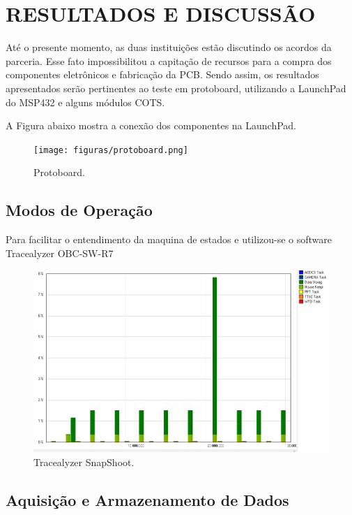 \chapter[RESULTADOS E DISCUSSÃO]{RESULTADOS E DISCUSSÃO}

Até o presente momento, as duas instituições estão discutindo os acordos da parceria. Esse fato impossibilitou a capitação de recursos para a compra dos componentes eletrônicos e fabricação da PCB. Sendo assim, os resultados apresentados serão pertinentes ao teste em protoboard, utilizando a LaunchPad do MSP432 e alguns módulos COTS.

A Figura abaixo mostra a conexão dos componentes na LaunchPad.

\begin{figure}[h]
	\centering
	\caption{Protoboard.}
	\texttt{[image: figuras/protoboard.png]}
	
	\label{proto}
\end{figure}

\section{Modos de Operação}

Para facilitar o entendimento da maquina de estados e utilizou-se o software Tracealyzer
OBC-SW-R7

\begin{figure}[h]
	\centering
	\caption{Tracealyzer SnapShoot.}
	\includegraphics[keepaspectratio=true,scale=0.5]{figuras/trace_snapshoot.png}
	
	\label{operationMode}
\end{figure}

\section{Aquisição e Armazenamento de Dados}

